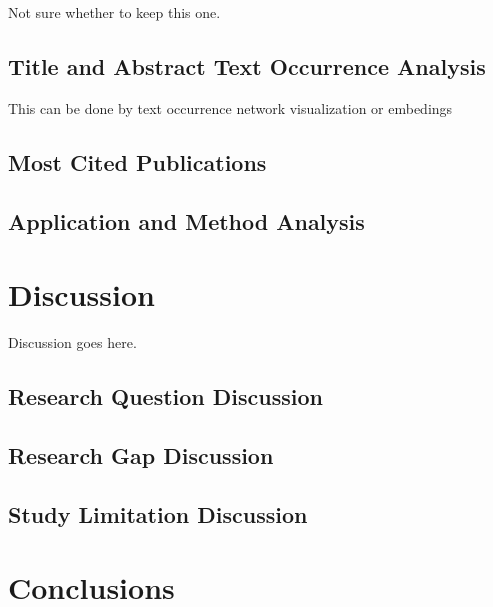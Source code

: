 \documentclass[parskip=full]{scrartcl}
\begin{document}
Not sure whether to keep this one.

\subsection{Title and Abstract Text Occurrence Analysis}

This can be done by text occurrence network visualization or embedings

\subsection{Most Cited Publications}

\subsection{Application and Method Analysis}

\section{Discussion}

Discussion goes here.

\subsection{Research Question Discussion}

\subsection{Research Gap Discussion}

\subsection{Study Limitation Discussion}

\section{Conclusions}


% 

\end{document}
